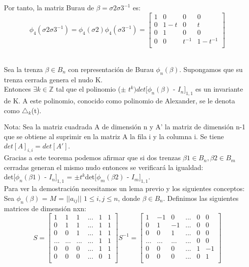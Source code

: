  Por tanto, la matriz Burau de $\beta = \sigma2\sigma3^{-1}$ es:
 \[ \phi_{4} (\sigma2\sigma3^{-1}) = \phi_{4} (\sigma2) \phi_{4}(\sigma3^{-1}) = \begin{bmatrix}
 1 & 0 & 0 & 0 \\
 0 & 1-t & 0 & t \\
 0 & 1 & 0 & 0  \\	
 0 & 0 & t^{-1} & 1-t^{-1} \\
 \end{bmatrix}\]\\
 
 
\begin{teo}\label{teoalex}
	Sea la trenza $\beta \in B_{n}$ con representación de Burau $\phi_{n}(\beta)$. Supongamos que su trenza cerrada genera el nudo K.\\
    Entonces $\exists k \in \mathds{Z}$ tal que el polinomio ($ \pm $ $ t^{k} )det[\phi_{n}(\beta)$ - $ I_{n} $$ ]_{1,1} $ es un invariante de K. A este polinomio, conocido como polinomio de Alexander, se le denota como $ \triangle_{k} $(t).
\end{teo}

Nota: Sea la matriz cuadrada A de dimensión n y A' la matriz de dimensión n-1 que se obtiene al suprimir en la matriz A la fila i y la columna i. 
Se tiene $ det[A]_{i,i}=det[A'] $.\\ 

Gracias a este teorema podemos afirmar que si dos trenzas $\beta1 \in B_{n}, \beta2 \in B_{m}$ cerradas generan el mismo nudo entonces se verificará la igualdad:\\
det[$\phi_{n}(\beta1)$ - $ I_{n} $$ ]_{1,1}$ = $ \pm t^{k} $det[$\phi_{m}(\beta2)$ - $ I_{m} $$ ]_{1,1}$.\\

Para ver la demostración necesitamos un lema previo y los siguientes conceptos:\\

\newpage
Sea $\phi_{n}(\beta)$ = $M$ = $||a_{ij}||$ $1 \le i,j \le n$, donde $\beta \in B_{n}$. Definimos las siguientes matrices de dimensión nxn:\\
  \[ S = \begin{bmatrix}
  1 & 1 & 1 &... & 1 & 1 \\
  0 & 1 & 1 &... & 1 & 1\\
  0 & 0 & 1 &... & 1 & 1 \\
  ... & ... & ...& ... & 1 & 1 \\	
  0 & 0 & 0 & ... & 1 & 1\\	
  0 & 0 & 0 & ... & 0 & 1\\
  \end{bmatrix} 
  S^{-1} = \begin{bmatrix}
  1 & -1 & 0 & ... & 0 & 0 \\
  0 & 1 & -1 & ... & 0 & 0\\
  0 & 0 & 1 & ... & 0  & 0\\
  ... & ... & ...& ... & 0 & 0  \\	
  0 & 0 & 0 &...& 1 & -1  \\	
  0 & 0 & 0 & ... & 0 & 1 \\
  \end{bmatrix}\]\\
  
